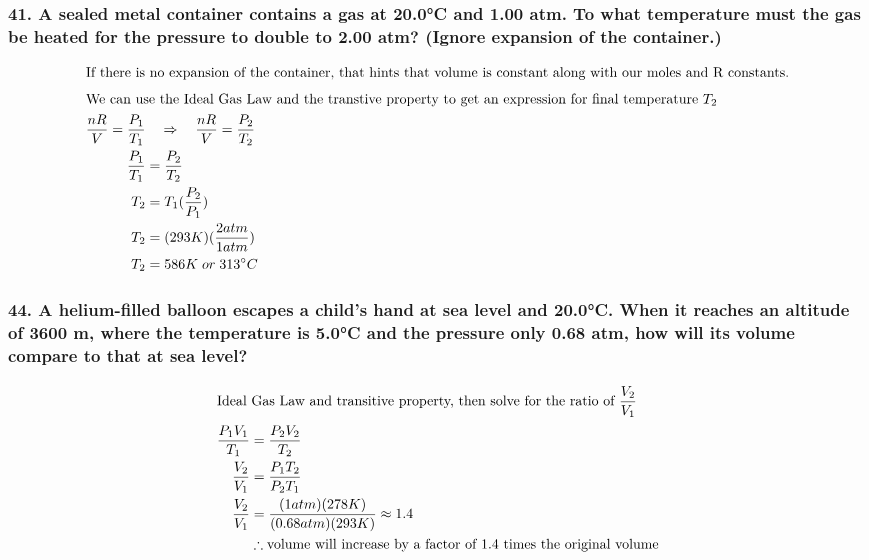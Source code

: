\documentclass{article}
\newcommand\rr{\quad\Rightarrow\quad}
\begin{document}
\subsubsection*{
    41. A sealed metal container contains a gas at 20.0°C and 1.00 atm. To what
    temperature must the gas be heated for the pressure to double to 2.00 atm? 
    (Ignore expansion of the container.)
}
\begin{align*}
    \intertext{If there is no expansion of the container, that hints that volume
    is constant along with our moles and R constants.}
    \intertext{We can use the Ideal Gas Law and the transtive property to get
    an expression for final temperature $T_2$}
    \frac {nR}{V} = \frac {P_1}{T_1} &\rr \frac {nR}{V} = \frac {P_2}{T_2} \\
    \frac {P_1}{T_1} &= \frac {P_2}{T_2} \\
    T_2 &= T_1(\frac {P_2}{P_1}) \\
    T_2 &= (293K)(\frac {2atm}{1atm}) \\
    T_2 &= 586K\;or\;313\degree C
\end{align*}
\subsubsection*{
    44. A helium-filled balloon escapes a child’s hand at sea level and 20.0°C.
    When it reaches an altitude of 3600 m, where the temperature is 5.0°C and
    the pressure only 0.68 atm, how will its volume compare to that at sea level?
}
\begin{align*}
    \intertext{Ideal Gas Law and transitive property, then solve for the ratio
    of $\displaystyle\frac{V_2}{V_1}$}
    \displaystyle\frac{P_1V_1}{T_1} &= \displaystyle\frac{P_2V_2}{T_2} \\
    \displaystyle\frac{V_2}{V_1} &= \displaystyle\frac{P_1T_2}{P_2T_1} \\
    \displaystyle\frac{V_2}{V_1} &= \displaystyle\frac{(1atm)(278K)}{(0.68atm)(293K)} \approx 1.4 \\
                                 &\therefore\text{volume will increase by a factor of 1.4 times the original
    volume}
\end{align*}
\end{document}
